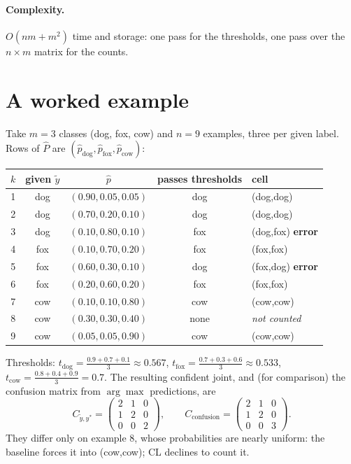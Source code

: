 \documentclass[11pt,a4paper]{report}
\newcommand{\Cyy}{C_{\tilde y,y^*}}
\newcommand{\Cconf}{C_{\text{confusion}}}
\newcommand{\1}{\mathbf 1}
\theoremstyle{definition}
\theoremstyle{plain}
\theoremstyle{remark}
\begin{document}
\paragraph{Complexity.} $O(nm+m^2)$ time and storage: one pass for the thresholds, one pass over the $n\times m$ matrix for the counts.

\section{A worked example}
Take $m=3$ classes (dog, fox, cow) and $n=9$ examples, three per given label. Rows of $\hat P$ are $(\hat p_{\text{dog}},\hat p_{\text{fox}},\hat p_{\text{cow}})$:
\begin{center}
\small
\begin{tabular}{@{}ccccl@{}}
\toprule
$k$ & given $\tilde y$ & $\hat p$ & passes thresholds & cell\\
\midrule
1 & dog & $(0.90,0.05,0.05)$ & dog & (dog,dog)\\
2 & dog & $(0.70,0.20,0.10)$ & dog & (dog,dog)\\
3 & dog & $(0.10,0.80,0.10)$ & fox & (dog,fox) \textbf{error}\\
4 & fox & $(0.10,0.70,0.20)$ & fox & (fox,fox)\\
5 & fox & $(0.60,0.30,0.10)$ & dog & (fox,dog) \textbf{error}\\
6 & fox & $(0.20,0.60,0.20)$ & fox & (fox,fox)\\
7 & cow & $(0.10,0.10,0.80)$ & cow & (cow,cow)\\
8 & cow & $(0.30,0.30,0.40)$ & none & \emph{not counted}\\
9 & cow & $(0.05,0.05,0.90)$ & cow & (cow,cow)\\
\bottomrule
\end{tabular}
\end{center}
Thresholds: $t_{\text{dog}}=\frac{0.9+0.7+0.1}{3}\approx0.567$, $t_{\text{fox}}=\frac{0.7+0.3+0.6}{3}\approx0.533$, $t_{\text{cow}}=\frac{0.8+0.4+0.9}{3}=0.7$. The resulting confident joint, and (for comparison) the confusion matrix from $\arg\max$ predictions, are
\[
\Cyy=\begin{pmatrix}2&1&0\\1&2&0\\0&0&2\end{pmatrix},\qquad
\Cconf=\begin{pmatrix}2&1&0\\1&2&0\\0&0&3\end{pmatrix}.
\]
They differ only on example 8, whose probabilities are nearly uniform: the baseline forces it into (cow,cow); CL declines to count it.
\end{document}
